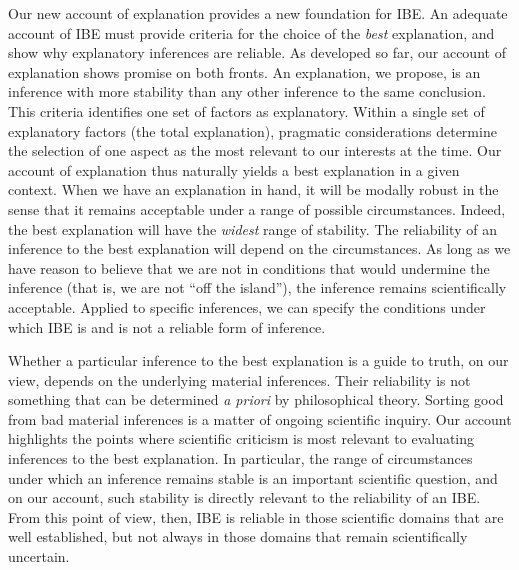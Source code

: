 \documentclass{article}[11pt]
\begin{document}
Our new account of explanation provides a new foundation for IBE.  An adequate account of IBE must provide criteria for the choice of the \textit{best} explanation, and show why explanatory inferences are reliable.  As developed so far, our account of explanation shows promise on both fronts.  An explanation, we propose, is an inference with more stability than any other inference to the same conclusion.  This criteria identifies one set of factors as explanatory.  Within a single set of explanatory factors (the total explanation), pragmatic considerations determine the selection of one aspect as the most relevant to our interests at the time.  Our account of explanation thus naturally yields a best explanation in a given context.  When we have an explanation in hand, it will be modally robust in the sense that it remains acceptable under a range of possible circumstances.  Indeed, the best explanation will have the \textit{widest} range of stability.  The reliability of an inference to the best explanation will depend on the circumstances.  As long as we have reason to believe that we are not in conditions that would undermine the inference (that is, we are not ``off the island''), the inference remains scientifically acceptable.  Applied to specific inferences, we can specify the conditions under which IBE is and is not a reliable form of inference.

Whether a particular inference to the best explanation is a guide to truth, on our view, depends on the underlying material inferences.  Their reliability is not something that can be determined \textit{a priori} by philosophical theory.  Sorting good from bad material inferences is a matter of ongoing scientific inquiry.  Our account highlights the points where scientific criticism is most relevant to evaluating inferences to the best explanation.  In particular, the range of circumstances under which an inference remains stable is an important scientific question, and on our account, such stability is directly relevant to the reliability of an IBE.   From this point of view, then, IBE is reliable in those scientific domains that are well established, but not always in those domains that remain scientifically uncertain.  

\end{document}
